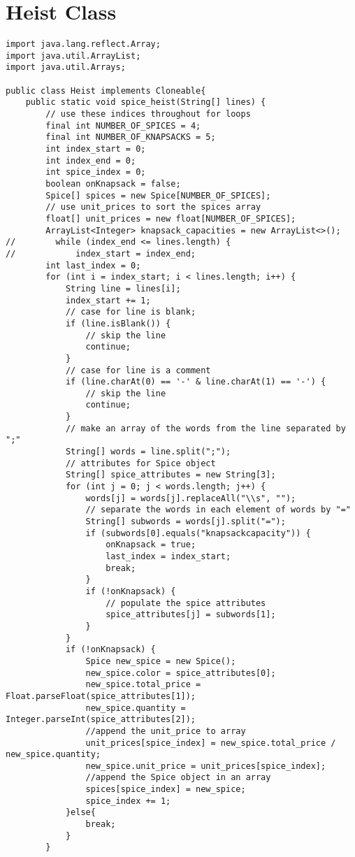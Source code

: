\documentclass{article}
\begin{document}
\section{Heist Class}
    \begin{lstlisting}
import java.lang.reflect.Array;
import java.util.ArrayList;
import java.util.Arrays;

public class Heist implements Cloneable{
    public static void spice_heist(String[] lines) {
        // use these indices throughout for loops
        final int NUMBER_OF_SPICES = 4;
        final int NUMBER_OF_KNAPSACKS = 5;
        int index_start = 0;
        int index_end = 0;
        int spice_index = 0;
        boolean onKnapsack = false;
        Spice[] spices = new Spice[NUMBER_OF_SPICES];
        // use unit_prices to sort the spices array
        float[] unit_prices = new float[NUMBER_OF_SPICES];
        ArrayList<Integer> knapsack_capacities = new ArrayList<>();
//        while (index_end <= lines.length) {
//            index_start = index_end;
        int last_index = 0;
        for (int i = index_start; i < lines.length; i++) {
            String line = lines[i];
            index_start += 1;
            // case for line is blank;
            if (line.isBlank()) {
                // skip the line
                continue;
            }
            // case for line is a comment
            if (line.charAt(0) == '-' & line.charAt(1) == '-') {
                // skip the line
                continue;
            }
            // make an array of the words from the line separated by ";"
            String[] words = line.split(";");
            // attributes for Spice object
            String[] spice_attributes = new String[3];
            for (int j = 0; j < words.length; j++) {
                words[j] = words[j].replaceAll("\\s", "");
                // separate the words in each element of words by "="
                String[] subwords = words[j].split("=");
                if (subwords[0].equals("knapsackcapacity")) {
                    onKnapsack = true;
                    last_index = index_start;
                    break;
                }
                if (!onKnapsack) {
                    // populate the spice attributes
                    spice_attributes[j] = subwords[1];
                }
            }
            if (!onKnapsack) {
                Spice new_spice = new Spice();
                new_spice.color = spice_attributes[0];
                new_spice.total_price = Float.parseFloat(spice_attributes[1]);
                new_spice.quantity = Integer.parseInt(spice_attributes[2]);
                //append the unit_price to array
                unit_prices[spice_index] = new_spice.total_price / new_spice.quantity;
                new_spice.unit_price = unit_prices[spice_index];
                //append the Spice object in an array
                spices[spice_index] = new_spice;
                spice_index += 1;
            }else{
                break;
            }
        }


\end{lstlisting}
\end{document}
